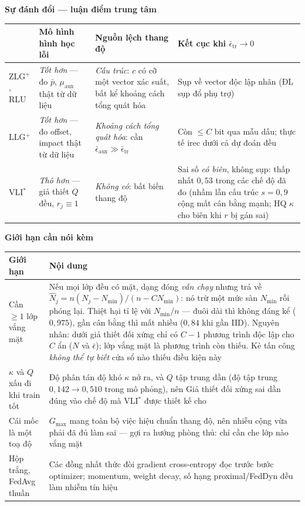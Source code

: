 \documentclass[11pt]{article}
\begin{document}
\vspace{1.0em}
\noindent\normalsize\textbf{Sự đánh đổi --- luận điểm trung tâm}

\vspace{0.3em}
\footnotesize
\noindent
\begin{tabular}{@{}l p{5.8cm} p{5.0cm} p{8.6cm}@{}}
\toprule
 & \textbf{Mô hình hình học lỗi} & \textbf{Nguồn lệch thang độ} &
 \textbf{Kết cục khi $\bar\epsilon_{\text{tr}}\to0$} \\
\midrule
ZLG$^+$, RLU &
\emph{Tốt hơn} --- đo $\bar p$, $\mu_{\text{aux}}$ thật từ dữ liệu &
\emph{Cấu trúc}: $c$ có cỡ một vector xác suất, bất kể khoảng cách tổng quát
hóa &
Sụp về vector độc lập nhãn (ĐL sụp đổ phụ trợ) \\
LLG$^+$ &
\emph{Tốt hơn} --- đo offset, impact thật từ dữ liệu &
\emph{Khoảng cách tổng quát hóa}: cần
$\bar\epsilon_{\text{aux}}\gg\bar\epsilon_{\text{tr}}$ &
Còn $\le C$ bit qua mẫu dấu; thực tế irec dưới cả dự đoán đều \\
VLI$^\ast$ &
\emph{Thô hơn} --- giả thiết $Q$ đều, $r_j\equiv1$ &
\emph{Không có}: bất biến thang độ &
Sai số \emph{có biên}, không sụp: thấp nhất $0{,}53$ trong các chế độ đã đo
(nhầm lẫn cấu trúc $s=0{,}9$ cộng mất cân bằng mạnh; HQ $\kappa$ cho biên khi
$r$ bị gán sai) \\
\bottomrule
\end{tabular}

\vspace{1.0em}
\noindent\normalsize\textbf{Giới hạn cần nói kèm}

\vspace{0.3em}
\footnotesize
\noindent
\begin{tabular}{@{}p{5.2cm} p{19.0cm}@{}}
\toprule
\textbf{Giới hạn} & \textbf{Nội dung} \\
\midrule
Cần $\ge1$ lớp vắng mặt &
Nếu mọi lớp đều có mặt, dạng đóng \emph{vẫn chạy} nhưng trả về
$\widehat N_j = n(N_j-N_{\min})/(n-CN_{\min})$: nó trừ một mức sàn $N_{\min}$
rồi phóng lại. Thiệt hại tỉ lệ với $N_{\min}/n$ --- đuôi dài thì không đáng
kể ($0{,}975$), gần cân bằng thì mất nhiều ($0{,}84$ khi gần IID). Nguyên
nhân: dưới giả thiết đối xứng chỉ có $C-1$ phương trình độc lập cho $C$ ẩn
($N$ và $\bar\epsilon$); lớp vắng mặt là phương trình còn thiếu. Kẻ tấn công
\emph{không thể tự biết} cửa sổ nào thiếu điều kiện này \\
$\kappa$ và $Q$ xấu đi khi train tốt &
Độ phân tán độ khó $\kappa$ nở ra, và $Q$ tập trung dần (độ tập trung
$0{,}142\to0{,}510$ trong mô phỏng), nên Giả thiết đối xứng sai dần đúng vào
chế độ mà VLI$^\ast$ được thiết kế cho \\
Cái mốc là một toạ độ &
$G_{\max}$ mang toàn bộ việc hiệu chuẩn thang độ, nên nhiễu cộng vừa phải đã
đủ làm sai --- gợi ra hướng phòng thủ: chỉ cần che lớp nào vắng mặt \\
Hộp trắng, FedAvg thuần &
Các đồng nhất thức đòi gradient cross-entropy đọc trước bước optimizer;
momentum, weight decay, số hạng proximal/FedDyn đều làm nhiễm tín hiệu \\
\bottomrule
\end{tabular}
\end{document}
